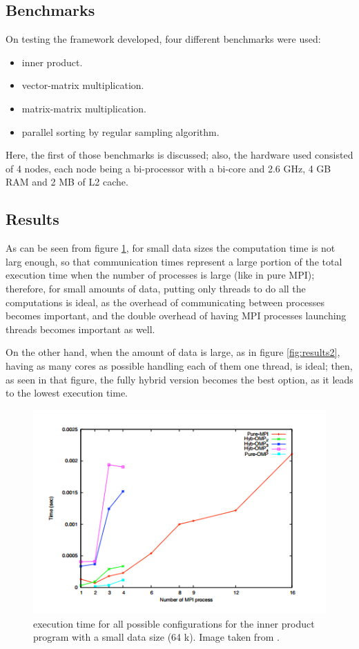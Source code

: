 \documentclass[paper=a4, fontsize=11pt]{scrartcl} %
\numberwithin{equation}{section} %
\numberwithin{figure}{section} %
\numberwithin{table}{section} %
\begin{document}
\subsection{Benchmarks}

On testing the framework developed, four different benchmarks were used:
\begin{itemize}
\item inner product.
\item vector-matrix multiplication.
\item matrix-matrix multiplication.
\item parallel sorting by regular sampling algorithm.
\end{itemize}
Here, the first of those benchmarks is discussed; also, the hardware used consisted of 4 nodes, each node being a bi-processor with a bi-core and 2.6 GHz, 4 GB RAM and 2 MB of L2 cache.


\subsection{Results}

As can be seen from figure \ref{fig:results1}, for small data sizes the computation time is not larg enough, so that communication times represent a large portion of the total execution time when the number of processes is large (like in pure MPI); therefore, for small amounts of data, putting only threads to do all the computations is ideal, as the overhead of communicating between processes becomes important, and the double overhead of having MPI processes launching threads becomes important as well.

On the other hand, when the amount of data is large, as in figure \ref{fig:results2}, having as many cores as possible handling each of them one thread, is ideal; then, as seen in that figure, the fully hybrid version becomes the best option, as it leads to the lowest execution time.



\begin{figure}
\centering
\includegraphics[width=0.8\linewidth]{results-plots1.png}
\caption{execution time for all possible configurations for the inner product program with a small data size (64 k). Image taken from \cite{hamidouche}.} \label{fig:results1}
\end{figure}
\end{document}
